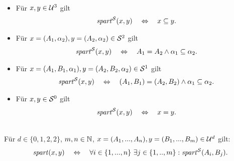 \begin{dfn}[$\Gspart^\einf$]\ 
    \begin{itemize}
        \item Für $x,y \in \mathcal{U}^3$ gilt
            \begin{align*}
                \mathit{spart}^{\mathcal{S}}(x,y) 
                \quad \Leftrightarrow \quad 
                x \subseteq y.
            \end{align*}
        \item Für $x = (A_1,\alpha_2), y = (A_2,\alpha_2) \in \mathcal{S}^2$ gilt
            \begin{align*}
                \mathit{spart}^{\mathcal{S}}(x,y) 
                \quad \Leftrightarrow \quad 
                A_1 = A_2 \land \alpha_1 \subseteq \alpha_2.
            \end{align*}
        \item Für $x = (A_1,B_1,\alpha_1), y = (A_2,B_2,\alpha_2) \in \mathcal{S}^1$ gilt
            \begin{align*}
                \mathit{spart}^{\mathcal{S}}(x,y) 
                \quad \Leftrightarrow \quad 
                (A_1, B_1) = (A_2,B_2) \land \alpha_1 \subseteq \alpha_2.
            \end{align*}
        \item Für $x, y \in \mathcal{S}^0$ gilt
            \begin{align*}
                \mathit{spart}^{\mathcal{S}}(x,y) 
                \quad \Leftrightarrow \quad 
                x=y.
            \end{align*}
    \end{itemize}
\end{dfn}


\begin{dfn}[$\Gspart$]\ \\
    Für $d \in \{0,1,2,2\}$, $m,n \in \mathbb{N}$, $x=(A_1, ..., A_n), y=(B_1, ..., B_m) \in \mathcal{U}^d$ gilt:
    $$\mathit{spart}(x,y) \quad \Leftrightarrow \quad \forall i \in \{1, ..., n\}\ \exists j \in \{1, .., m\}: \mathit{spart}^{\mathcal{S}}(A_i,B_j). $$
\end{dfn}






